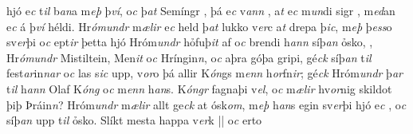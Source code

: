hjó e\textit{c} t\textit{il} b\textit{an}a m\textit{eþ} þ\textit{ví},
o\textit{c} þ\textit{at}  Semíngr   , þá e\textit{c} v\textit{an}\textit{n} , a\textit{t} e\textit{c} m\textit{un}di    sigr   , m\textit{ed}an e\textit{c} á þ\textit{ví} héldi. Hr\textit{ómundr} m\textit{ælir} e\textit{c} held þ\textit{at}  lukko v\textit{er}c a\textit{t} drepa þ\textit{ic}, m\textit{eþ} þ\textit{ess}o sv\textit{er}þi  o\textit{c} ept\textit{ir} þetta
hjó Hróm\textit{undr} hỏfuþ\textit{it} af   o\textit{c} brendi h\textit{ann} síþ\textit{an}  ỏsko,   ,    Hr\textit{ómundr}  Mistiltein, Men\textit{it} o\textit{c} Hríngin\textit{n}, o\textit{c}  aþra góþa gripi, gé\textit{ck} síþ\textit{an} t\textit{il}
fest\textit{ar}in\textit{n}\textit{ar} o\textit{c} las s\textit{ic} upp,
v\textit{or}o þá allir K\textit{ón}gs m\textit{enn}  h\textit{or}fn\textit{ir}; gé\textit{ck} Hróm\textit{undr} þ\textit{ar}
t\textit{il}  h\textit{ann}  Olaf K\textit{óng} o\textit{c} m\textit{enn} h\textit{an}s.
K\textit{óngr}  fagnaþi   
  v\textit{el},
o\textit{c} m\textit{ælir} hv\textit{or}nig skildot þiþ
Þráin\textit{n}? Hróm\textit{undr} m\textit{ælir} allt ge\textit{ck} at  ósk\textit{om}, m\textit{eþ} h\textit{an}s egin sv\textit{er}þi hjó
e\textit{c} , 
o\textit{c}  síþ\textit{an} upp t\textit{il} ỏsko.
 Slíkt   mesta happa v\textit{er}k  
 || 
  o\textit{c} erto 
